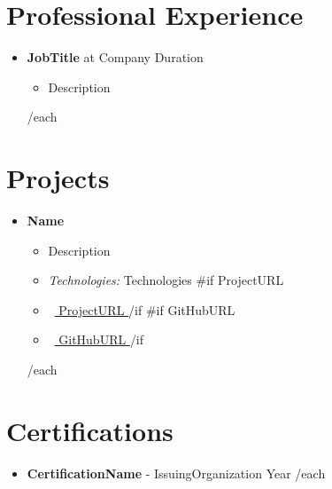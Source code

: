 \documentclass[a4paper,11pt]{article}
\begin{document}
\section*{Professional Experience}
\begin{itemize}
{{#each Experience}}
    \item \textbf{{{ JobTitle }}} at {{ Company }} \hfill {{ Duration }}
    \begin{itemize}
        \item {{ Description }}
    \end{itemize}
{{/each}}
\end{itemize}

\section*{Projects}
\begin{itemize}
{{#each Projects}}
    \item \textbf{{{ Name }}}
    \begin{itemize}
        \item {{ Description }}
        \item \textit{Technologies:} {{ Technologies }}
        {{#if ProjectURL}}
            \item \faLink\ \href{{{ ProjectURL }}}{{{ ProjectURL }}}
        {{/if}}
        {{#if GitHubURL}}
            \item \faGithub\ \href{{{ GitHubURL }}}{{{ GitHubURL }}}
        {{/if}}
    \end{itemize}
{{/each}}
\end{itemize}

\section*{Certifications}
\begin{itemize}
{{#each Certifications}}
    \item \textbf{{{ CertificationName }}} - {{ IssuingOrganization }} \hfill {{ Year }}
{{/each}}
\end{itemize}
\end{document}
